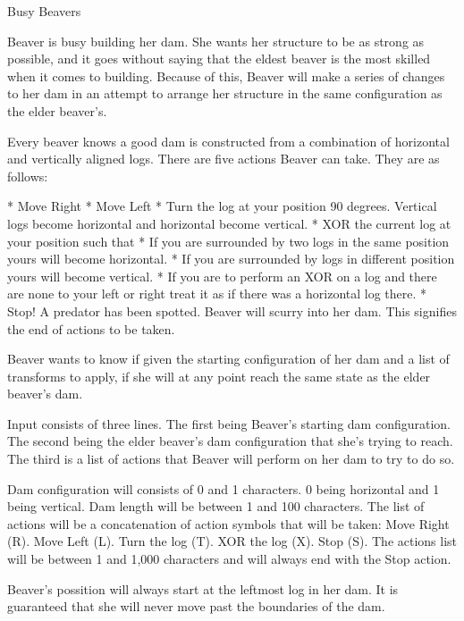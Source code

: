 \begin{problem}{Busy Beavers}

Beaver is busy building her dam. She wants her structure to be as strong as possible, and it goes without saying that the eldest beaver is the most skilled when it comes to building. Because of this, Beaver will make a series of changes to her dam in an attempt to arrange her structure in the same configuration as the elder beaver’s.

Every beaver knows a good dam is constructed from a combination of horizontal and vertically aligned logs. There are five actions Beaver can take. They are as follows:

	* Move Right
	* Move Left
	* Turn the log at your position 90 degrees. Vertical logs become horizontal and horizontal become vertical.
	* XOR the current log at your position such that
		* If you are surrounded by two logs in the same position yours will become horizontal.
		* If you are surrounded by logs in different position yours will become vertical.
		* If you are to perform an XOR on a log and there are none to your left or right treat it as if there was a horizontal log there.
	* Stop! A predator has been spotted. Beaver will scurry into her dam. This signifies the end of actions to be taken.

Beaver wants to know if given the starting configuration of her dam and a list of transforms to apply, if she will at any point reach the same state as the elder beaver’s dam.

\end{problem}

\begin{formalin}
Input consists of three lines. The first being Beaver’s starting dam configuration. The second being the elder beaver’s dam configuration that she’s trying to reach. The third is a list of actions that Beaver will perform on her dam to try to do so.

Dam configuration will consists of 0 and 1 characters. 0 being horizontal and 1 being vertical. Dam length will be between 1 and 100 characters. The list of actions will be a concatenation of action symbols that will be taken: Move Right (R). Move Left (L). Turn the log (T). XOR the log (X). Stop (S). The actions list will be between 1 and 1,000 characters and will always end with the Stop action.

Beaver's possition will always start at the leftmost log in her dam. It is guaranteed that she will never move past the boundaries of the dam.
\end{formalin}

